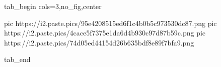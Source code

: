 
 
 
 
 


\ifcmt
  tab_begin cols=3,no_fig,center

     pic https://i2.paste.pics/95e4208515ed6f1c4b0b5c973530dc87.png
		 pic https://i2.paste.pics/4cace5f7375e1da6d4b930c97d87b59c.png
		 pic https://i2.paste.pics/74d05ed44154d26b635bdf8e89f7bfa9.png

  tab_end
\fi
